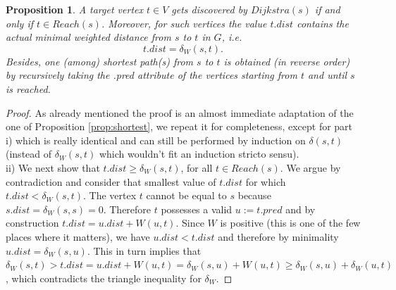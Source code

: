 \documentclass[12pt]{article}
\theoremstyle{plain}
\newtheorem{proposition}{Proposition}
\theoremstyle{remark}
\begin{document}
\begin{proposition}\label{prop:dijkstra}
	A target vertex $t \in V$ gets discovered by $Dijkstra(s)$ if and only if $t \in
	Reach(s)$. Moreover, for such vertices the value $t.dist$ contains the actual
	minimal weighted distance from $s$ to $t$ in $G$, i.e.
	$$
	t.dist = \delta_W(s,t).
	$$
	Besides, one (among) shortest path(s) from $s$ to $t$ is 
	obtained (in reverse order) by recursively taking the .pred 
	attribute of the vertices starting from $t$ and until $s$ is reached.
\end{proposition}
\begin{proof}
As already mentioned the proof is an almost immediate adaptation of the one of
Proposition \ref{prop:shortest}, we repeat it for completeness, except for 
part i) which is really identical and can still be performed by induction on
$\delta(s,t)$ (instead of $\delta_W(s,t)$ which wouldn't fit an induction stricto  
sensu).\\

ii) We next show that $t.dist \geq \delta_W(s,t)$, for all $t \in Reach(s).$
We argue by contradiction and consider that smallest value of $t.dist$ for which 
$t.dist < \delta_W(s,t).$ The vertex $t$ cannot be equal to $s$ because
$s.dist = \delta_W(s,s) = 0.$ Therefore $t$ possesses a valid $u :=
t.pred$ and by construction $t.dist = u.dist + W(u,t).$ Since $W$ is
positive (this is one of the few places where it matters), we have 
$u.dist < t.dist$ and therefore by minimality $u.dist = \delta_W(s,u).$ This in
	turn implies that $\delta_W(s,t) > t.dist = u.dist + W(u,t) =
	\delta_W(s,u) + W(u,t) \geq \delta_W(s,u) + \delta_W(u,t)$, which
	contradicts the triangle inequality for $\delta_W.$ 


\end{proof}
\end{document}

